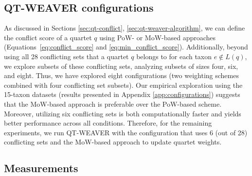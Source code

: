 \documentclass[runningheads]{llncs}
\begin{document}
 

 
\subsection{QT-WEAVER configurations}
\label{sec:qt-weaver-configuration}
\vspace{-3pt}
As discussed in Sections \ref{sec:qt-conflict}, \ref{sec:qt-weaver-algorithm}, we can define the conflict score of a quartet $q$ using PoW- or MoW-based approaches (Equations~\ref{eq:conflict_score} and \ref{eq:min_conflict_score}). %
Additionally, beyond using all 28 conflicting sets that a quartet $q$ belongs to for each taxon $e \notin L(q)$, we explore subsets of these conflicting sets, analyzing subsets of sizes four, six, and eight. Thus, we have explored eight configurations (two weighting schemes combined with four conflicting set subsets). Our empirical exploration using the 15-taxon datasets (results presented in Appendix \ref{app:configurations}) suggests that the MoW-based approach is preferable over the PoW-based scheme. Moreover, utilizing six conflicting sets is both computationally faster and yields better performance across all conditions. Therefore, for the remaining experiments, we run QT-WEAVER with the configuration that uses 6 (out of 28) conflicting sets and the MoW-based approach to update quartet weights.

\subsection{Measurements}
\end{document}
